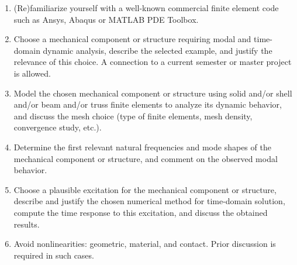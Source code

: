\documentclass[12pt]{article}
\begin{document}
\begin{enumerate}
  \item (Re)familiarize yourself with a well-known commercial finite element code such as Ansys, Abaqus or MATLAB PDE Toolbox.
  \item Choose a mechanical component or structure requiring modal and time-domain dynamic analysis, describe the selected example, and justify the relevance of this choice. A connection to a current semester or master project is allowed.
  \item Model the chosen mechanical component or structure using solid and/or shell and/or beam and/or truss finite elements to analyze its dynamic behavior, and discuss the mesh choice (type of finite elements, mesh density, convergence study, etc.).
  \item Determine the first relevant natural frequencies and mode shapes of the mechanical component or structure, and comment on the observed modal behavior.
  \item Choose a plausible excitation for the mechanical component or structure, describe and justify the chosen numerical method for time-domain solution, compute the time response to this excitation, and discuss the obtained results.
  \item  Avoid nonlinearities: geometric, material, and contact. Prior discussion is required in such cases.
\end{enumerate}
\end{document}
